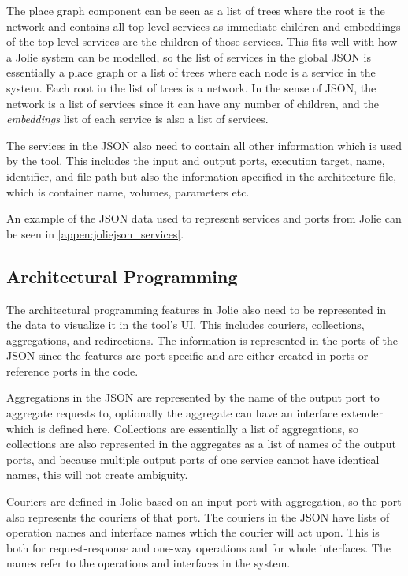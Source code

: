 The place graph component can be seen as a list of trees where the root is the network and contains all top-level services as immediate children and embeddings of the top-level services are the children of those services.
This fits well with how a Jolie system can be modelled, so the list of services in the global JSON is essentially a place graph or a list of trees where each node is a service in the system.
Each root in the list of trees is a network. In the sense of JSON, the network is a list of services since it can have any number of children, and the \emph{embeddings} list of each service is also a list of services.

The services in the JSON also need to contain all other information which is used by the tool.
This includes the input and output ports, execution target, name, identifier, and file path but also the information specified in the architecture file, which is container name, volumes, parameters etc.

An example of the JSON data used to represent services and ports from Jolie can be seen in \cref{appen:joliejson_services}.

\subsection{Architectural Programming}
The architectural programming features in Jolie also need to be represented in the data to visualize it in the tool's UI.
This includes couriers, collections, aggregations, and redirections. The information is represented in the ports of the JSON since the features are port specific and are either created in ports or reference ports in the code.

Aggregations in the JSON are represented by the name of the output port to aggregate requests to, optionally the aggregate can have an interface extender which is defined here.
Collections are essentially a list of aggregations, so collections are also represented in the aggregates as a list of names of the output ports, and because multiple output ports of one service cannot have identical names, this will not create ambiguity.

Couriers are defined in Jolie based on an input port with aggregation, so the port also represents the couriers of that port.
The couriers in the JSON have lists of operation names and interface names which the courier will act upon. This is both for request-response and one-way operations and for whole interfaces. The names refer to the operations and interfaces in the system.

